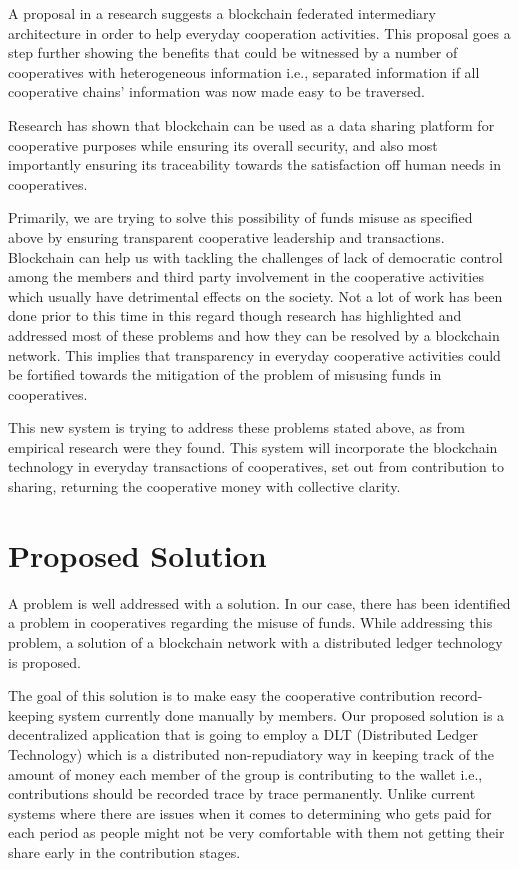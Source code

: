 \documentclass{article}
\begin{document}
\begin{flushleft}
A proposal in a research suggests a blockchain federated intermediary architecture in order to help everyday cooperation activities. This proposal goes a step further showing the benefits that could be witnessed by a number of cooperatives with heterogeneous information i.e., separated information if all cooperative chains' information was now made easy to be traversed. \cite{ieee_s8637578} 

Research has shown that blockchain can be used as a data sharing platform for cooperative purposes while ensuring its overall security, and also most importantly ensuring its traceability towards the satisfaction off human needs in cooperatives. \cite{alma991019580288704436, proquest2282979983} 

Primarily, we are trying to solve this possibility of funds misuse as specified above by ensuring transparent cooperative leadership and transactions. Blockchain can help us with tackling the challenges of lack of democratic control among the members and third party involvement in the cooperative activities which usually have detrimental effects on the society.
Not a lot of work has been done prior to this time in this regard though research has highlighted and addressed most of these problems and how they can be resolved by a blockchain network. This implies that transparency in everyday cooperative activities could be fortified towards the mitigation of the problem of misusing funds in cooperatives.

This new system is trying to address these problems stated above, as from empirical research were they found. This system will incorporate the blockchain technology in everyday transactions of cooperatives, set out from contribution to sharing, returning the cooperative money with collective clarity.

\section{Proposed Solution}
A problem is well addressed with a solution. In our case, there has been identified a problem in cooperatives regarding the misuse of funds. While addressing this problem, a solution of a blockchain network with a distributed ledger technology is proposed.

The goal of this solution is to make easy the cooperative contribution record-keeping system currently done manually by members. Our proposed solution is a decentralized application that is going to employ a DLT (Distributed Ledger Technology) which is a distributed non-repudiatory way in keeping track of the amount of money each member of the group is contributing to the wallet i.e., contributions should be recorded trace by trace permanently. Unlike current systems where there are issues when it comes to determining who gets paid for each period as people might not be very comfortable with them not getting their share early in the contribution stages. 


\end{flushleft}
\end{document}
